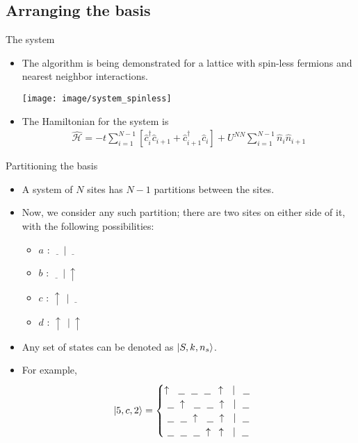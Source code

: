 \documentclass[usenames,dvipsnames]{beamer}
\newcommand{\ham}{\hat{\mathcal{H}}}
\renewcommand{\u}{\uparrow\ }
\newcommand{\e}{\ \underline{\ \ }\ }
\newcommand{\p}{\ |\ }
\begin{document}
\subsection{Arranging the basis}
\begin{frame}{The system}
	\begin{itemize}
		\item {
			The algorithm is being demonstrated for a lattice with spin-less fermions and nearest neighbor interactions.
			\begin{center}
				\texttt{[image: image/system\_spinless]}
			\end{center}

			}
		\item {The Hamiltonian for the system is
			\begin{align}\label{eqn:spinlessH}
			\ham = -t \sum_{i = 1}^{N-1} \left[ \hat{c}^{\dagger}_{i} \hat{c}^{}_{i+1} + \hat{c}^{\dagger}_{i+1} \hat{c}^{}_{i}\right] + U^{NN}\sum_{i=1}^{N-1} \hat{n}_i \hat{n}_{i+1}
			\end{align}
			}
	\end{itemize}
\end{frame}
\begin{frame}{Partitioning the basis}
	\begin{itemize}
		\item {
			A system of $ N $ sites has $ N-1 $ partitions between the sites.
			}
		\item {
			Now, we consider any such partition; there are two sites on either side of it, with the following possibilities:
			\begin{itemize}
				\item $ a $ : $ \e \p \e $\\ 
				\item $ b $ : $ \e \p \u $\\
				\item $ c $ : $ \u \p \e $\\
				\item $ d $ : $ \u \p \u $\\
			\end{itemize}
			}
		\item {
			Any set of states can be denoted as $ \ket{S, k, n_s} $.
			}
		\item {
			For example,
			\begin{align*}
			\ket{5,c,2} =
			\begin{cases}
			\u \e \e \e \,\u \p\, \e \\
			\e \u \e \e \u \p \e \\
			\e \e \u \e \u \p \e \\
			\e \e \e \u\,\,\,\u \p \e \\
			\end{cases}
			\end{align*}
			}
	\end{itemize}
\end{frame}
\end{document}
